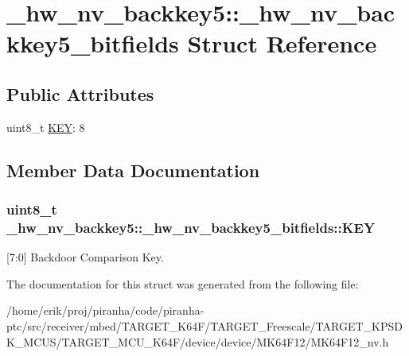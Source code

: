 \hypertarget{struct__hw__nv__backkey5_1_1__hw__nv__backkey5__bitfields}{}\section{\+\_\+hw\+\_\+nv\+\_\+backkey5\+:\+:\+\_\+hw\+\_\+nv\+\_\+backkey5\+\_\+bitfields Struct Reference}
\label{struct__hw__nv__backkey5_1_1__hw__nv__backkey5__bitfields}
\subsection*{Public Attributes}
\begin{DoxyCompactItemize}
\item 
uint8\+\_\+t \hyperlink{struct__hw__nv__backkey5_1_1__hw__nv__backkey5__bitfields_ae4cca17b63989510e6d47e75fa6696ca}{K\+EY}\+: 8
\end{DoxyCompactItemize}


\subsection{Member Data Documentation}
\subsubsection[{\texorpdfstring{K\+EY}{KEY}}]{\setlength{\rightskip}{0pt plus 5cm}uint8\+\_\+t \+\_\+hw\+\_\+nv\+\_\+backkey5\+::\+\_\+hw\+\_\+nv\+\_\+backkey5\+\_\+bitfields\+::\+K\+EY}\hypertarget{struct__hw__nv__backkey5_1_1__hw__nv__backkey5__bitfields_ae4cca17b63989510e6d47e75fa6696ca}{}\label{struct__hw__nv__backkey5_1_1__hw__nv__backkey5__bitfields_ae4cca17b63989510e6d47e75fa6696ca}
\mbox{[}7\+:0\mbox{]} Backdoor Comparison Key. 

The documentation for this struct was generated from the following file\+:\begin{DoxyCompactItemize}
\item 
/home/erik/proj/piranha/code/piranha-\/ptc/src/receiver/mbed/\+T\+A\+R\+G\+E\+T\+\_\+\+K64\+F/\+T\+A\+R\+G\+E\+T\+\_\+\+Freescale/\+T\+A\+R\+G\+E\+T\+\_\+\+K\+P\+S\+D\+K\+\_\+\+M\+C\+U\+S/\+T\+A\+R\+G\+E\+T\+\_\+\+M\+C\+U\+\_\+\+K64\+F/device/device/\+M\+K64\+F12/M\+K64\+F12\+\_\+nv.\+h\end{DoxyCompactItemize}
